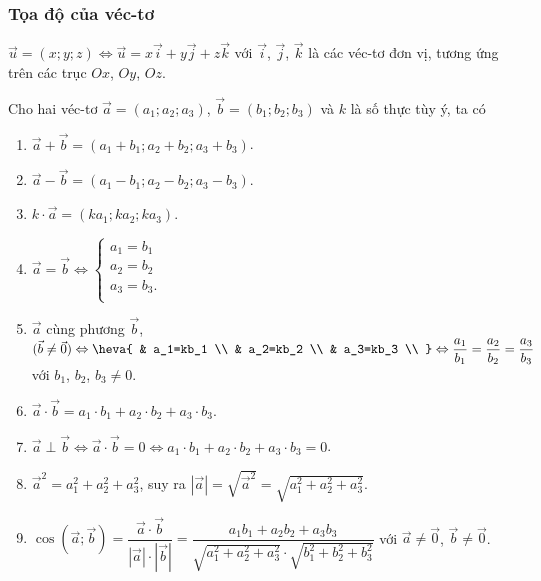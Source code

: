 \begin{tomtat}
	\subsubsection{Tọa độ của véc-tơ}
	\begin{dn}
		$\vec{u}=(x;y;z)\Leftrightarrow \vec{u}=x\vec{i}+y\vec{j}+z\vec{k}$ với $\vec{i}$, $\vec{j}$, $\vec{k}$ là các véc-tơ đơn vị, tương ứng trên các trục $Ox$, $Oy$, $Oz$.
		
	\end{dn}
	\begin{tc}
		Cho hai véc-tơ $\vec{a}=(a_1;a_2;a_3 )$, $\vec{b}=(b_1;b_2;b_3)$ và $k$ là số thực tùy ý, ta có
		\begin{enumerate}
			\item $\vec{a}+\vec{b}=(a_1+b_1;a_2+b_2;a_3+b_3 )$.
			\item $\vec{a}-\vec{b}=(a_1-b_1;a_2-b_2;a_3-b_3 )$.
			\item $k\cdot \vec{a}=(ka_1;ka_2;ka_3 )$.
			\item $\vec{a}=\vec{b}\Leftrightarrow \left\{ \begin{matrix}
			a_1=b_1 \\
			a_2=b_2 \\
			a_3=b_3. \\
			\end{matrix} \right.$
			\item $\vec{a}$ cùng phương $\vec{b}$, $(\vec{b}\ne \vec{0} )\Leftrightarrow  \heva{
				& a_1=kb_1 \\
				& a_2=kb_2 \\
				& a_3=kb_3 \\
			}\Leftrightarrow  \dfrac{a_1}{b_1}=\dfrac{a_2}{b_2}=\dfrac{a_3}{b_3}$ với $ b_1$,  $b_2$, $b_3\ne 0$.
			\item $\vec{a}\cdot \vec{b}=a_1\cdot b_1+a_2\cdot b_2+a_3\cdot b_3$.
			\item $\vec{a}\perp \vec{b}\Leftrightarrow \vec{a}\cdot \vec{b}=0\Leftrightarrow a_1\cdot b_1+a_2\cdot b_2+a_3\cdot b_3=0$.
			\item $\vec{a}^2=a_1^2+a_2^2+a_3^2$, suy ra $\left| \vec{a} \right|=\sqrt{\vec{a}^2}=\sqrt{a_1^2+a_2^2+a_3^2}$.
			\item $\cos (\vec{a};\vec{b} )=\dfrac{\vec{a}\cdot \vec{b}}{\left| \vec{a} \right|\cdot \left| \vec{b} \right|}=\dfrac{a_1b_1+a_2b_2+a_3b_3}{\sqrt{a_1^2+a_2^2+a_3^2}\cdot \sqrt{b_1^2+b_2^2+b_3^2}}$ với $\vec{a}\ne \vec{0}$, $\vec{b}\ne \vec{0}$.
			
		\end{enumerate}
	\end{tc}

\end{tomtat}
